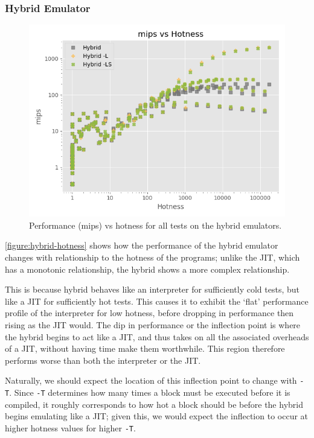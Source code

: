 \subsubsection{Hybrid Emulator}
\label{section:perf-hybrid}


\begin{figure}[H]
    \centering
    \includegraphics[scale=0.75]{output/graphs/scatter/hybrid/hotness.png}
    \caption{Performance (mips) vs hotness for all tests on the hybrid emulators.}
    \label{figure:hybrid-hotness}
\end{figure}

\autoref{figure:hybrid-hotness} shows how the performance of the hybrid emulator changes with relationship to the hotness of the programs; unlike the JIT, which has a monotonic relationship, the hybrid shows a more complex relationship.

This is because hybrid behaves like an interpreter for sufficiently cold tests, but like a JIT for sufficiently hot tests. This causes it to exhibit the `flat' performance profile of the interpreter for low hotness, before dropping in performance then rising as the JIT would. The dip in performance or the inflection point is where the hybrid begins to act like a JIT, and thus takes on all the associated overheads of a JIT, without having time make them worthwhile. This region therefore performs worse than both the interpreter or the JIT.

Naturally, we should expect the location of this inflection point to change with \texttt{-T}. Since \texttt{-T} determines how many times a block must be executed before it is compiled, it roughly corresponds to how hot a block should be before the hybrid begins emulating like a JIT; given this, we would expect the inflection to occur at higher hotness values for higher \texttt{-T}.

